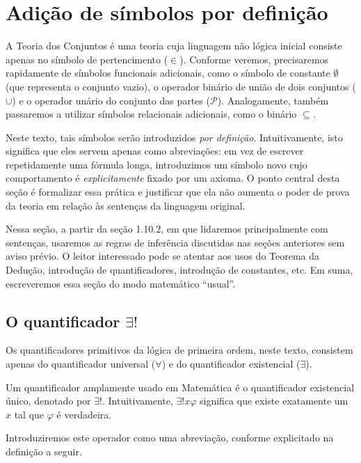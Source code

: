 \section{Adição de símbolos por definição}\label{sec:adicaoSimbolosPorDefinicao}

A Teoria dos Conjuntos é uma teoria cuja linguagem não lógica inicial consiste apenas no símbolo de pertencimento ($\in$).
Conforme veremos, precisaremos rapidamente de símbolos funcionais adicionais, como o símbolo de constante $\emptyset$ (que representa o conjunto vazio), o operador binário de união de dois conjuntos ($\cup$) e o operador unário do conjunto das partes ($\mathcal{P}$).
Analogamente, também passaremos a utilizar símbolos relacionais adicionais, como o binário $\subseteq$.

Neste texto, tais símbolos serão introduzidos \emph{por definição}.
Intuitivamente, isto significa que eles servem apenas como abreviações: em vez de escrever repetidamente uma fórmula longa, introduzimos um símbolo novo cujo comportamento é \emph{explicitamente} fixado por um axioma.
O ponto central desta seção é formalizar essa prática e justificar que ela não aumenta o poder de prova da teoria em relação às sentenças da linguagem original.

Nessa seção, a partir da seção 1.10.2, em que lidaremos principalmente com sentenças, usaremos as regras de inferência discutidas nas seções anteriores sem aviso prévio.
O leitor interessado pode se atentar aos usos do Teorema da Dedução, introdução de quantificadores, introdução de constantes, etc.
Em suma, escreveremos essa seção do modo matemático ``usual''.

\subsection{O quantificador \texorpdfstring{$\exists!$}{∃!}}\label{subsec:quantificadorExistsUnique}

Os quantificadores primitivos da lógica de primeira ordem, neste texto, consistem apenas do quantificador universal ($\forall$) e do quantificador existencial ($\exists$).

Um quantificador amplamente usado em Matemática é o quantificador existencial único, denotado por $\exists!$.
Intuitivamente, $\exists! x \varphi$ significa que existe exatamente um $x$ tal que $\varphi$ é verdadeira.

Introduziremos este operador como uma abreviação, conforme explicitado na definição a seguir.

